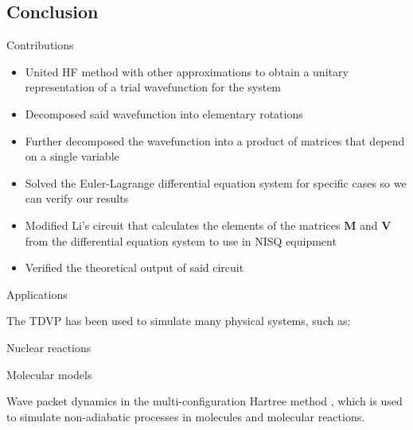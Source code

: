 \documentclass[professionalfonts]{beamer}
\newcommand{\SubItem}[1]{
    {\setlength\itemindent{15pt} \item[*] #1}
}
\begin{document}


\subsection{\textbf{Conclusion}}

\begin{frame}{Contributions}
	\begin{itemize}
		\item United HF method with other approximations to obtain a unitary representation of a trial wavefunction for the system

		\item Decomposed said wavefunction into elementary rotations

		\item Further decomposed the wavefunction into a product of matrices that depend on a single variable

		\item Solved the Euler-Lagrange differential equation system for specific cases so we can verify our results

		\item Modified Li's circuit \citep{benjamin} that calculates the elements of the matrices $\bm M$ and $\bm V$ from the differential equation system to use in NISQ equipment

		\item Verified the theoretical output of said circuit
	\end{itemize}
\end{frame}


\begin{frame}{Applications}
	\begin{itemize}
		\item The TDVP \citep{kramer} has been used to simulate many physical systems, such as:
			\SubItem{Nuclear reactions \citep{tdvp4}}
			\SubItem{Molecular models \citep{tdvp5,kramer}}
			\SubItem{Wave packet dynamics in the multi-configuration Hartree method \citep{tdvp7,tdvp8,tdvp9,tdvp10,tdvp11}, which is used to simulate non-adiabatic processes in molecules and molecular reactions.}
	\end{itemize}
\end{frame}
\end{document}
